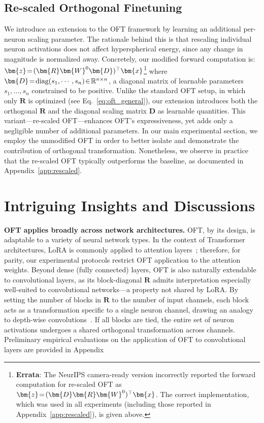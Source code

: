 \subsection{Re-scaled Orthogonal Finetuning}

We introduce an extension to the OFT framework by learning an additional per-neuron scaling parameter. The rationale behind this is that rescaling individual neuron activations does not affect hyperspherical energy, since any change in magnitude is normalized away. Concretely, our modified forward computation is: $\thickmuskip=2mu \medmuskip=2mu\bm{z}=(\bm{R}\bm{W}^0\bm{D})^\top\bm{x}$\footnote{\textbf{Errata}: The NeurIPS camera-ready version incorrectly reported the forward computation for re-scaled OFT as $\thickmuskip=2mu \medmuskip=2mu\bm{z}=(\bm{D}\bm{R}\bm{W}^0)^\top\bm{x}$. The correct implementation, which was used in all experiments (including those reported in Appendix~\ref{app:rescaled}), is given above.} where $\thickmuskip=2mu \medmuskip=2mu \bm{D}=\text{diag}(s_1,\cdots,s_n)\in\mathbb{R}^{n\times n}$, a diagonal matrix of learnable parameters $s_1,\ldots,s_n$ constrained to be positive. Unlike the standard OFT setup, in which only $\bm{R}$ is optimized (see Eq.~\eqref{eq:oft_general}), our extension introduces both the orthogonal $\bm{R}$ and the diagonal scaling matrix $\bm{D}$ as learnable quantities. This variant—re-scaled OFT—enhances OFT's expressiveness, yet adds only a negligible number of additional parameters. In our main experimental section, we employ the unmodified OFT in order to better isolate and demonstrate the contribution of orthogonal transformation. Nonetheless, we observe in practice that the re-scaled OFT typically outperforms the baseline, as documented in Appendix~\ref{app:rescaled}.

\section{Intriguing Insights and Discussions}

\textbf{OFT applies broadly across network architectures.} OFT, by its design, is adaptable to a variety of neural network types. In the context of Transformer architectures, LoRA is commonly applied to attention layers~\cite{hulora2022}; therefore, for parity, our experimental protocols restrict OFT application to the attention weights. Beyond dense (fully connected) layers, OFT is also naturally extendable to convolutional layers, as its block-diagonal $\bm{R}$ admits interpretation especially well-suited to convolutional networks—a property not shared by LoRA. By setting the number of blocks in $\bm{R}$ to the number of input channels, each block acts as a transformation specific to a single neuron channel, drawing an analogy to depth-wise convolutions~\cite{chollet2017xception}. If all blocks are tied, the entire set of neuron activations undergoes a shared orthogonal transformation across channels. Preliminary empirical evaluations on the application of OFT to convolutional layers are provided in Appendix~

